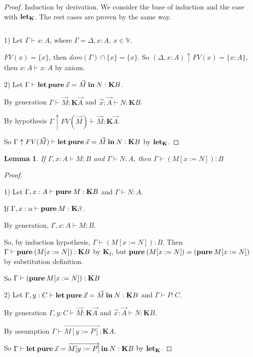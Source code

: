 \documentclass[a4paper]{article}
\newtheorem{lemma}{Lemma}
\begin{document}
  \begin{proof}

  Induction by derivation. We consider the base of induction and the case with  ${\bf let}_{\textbf{K}}$. The rest
  cases are
  proven by the same way.

  $ $

  1) Let $\Gamma \vdash x : A$, where $\Gamma = \Delta, x : A$, $x \in \mathbb{V}$.

  $FV(x) = \{ x\}$, then $dom(\Gamma) \cap \{ x\} = \{ x\}. $ So $(\Delta, x : A) \uparrow FV(x) = \{ x
  : A\}$, then $x : A \vdash x : A$ by axiom.

  2) Let $\Gamma \vdash {\bf let \: pure \:} \vec{x} = \vec{M} {\bf \: in \:} N : \textbf{K}B$.

  By generation $\Gamma \vdash \vec{M} : \textbf{K}\vec{A}$ and $\vec{x} : \vec{A} \vdash N : \textbf{K}B$.

  By hypothesis $\Gamma \uparrow FV(\vec{M}) \vdash \vec{M} : \textbf{K}\vec{A}$.

  So $\Gamma \uparrow FV(\vec{M}) \vdash {\bf let \: pure \:} \vec{x} = \vec{M} {\bf \: in \:} N : \textbf{K}B$ by ${\bf let}_{\textbf{K}}$.

  \end{proof}

  \vspace{\baselineskip}

  \begin{lemma}

  If $\Gamma, x : A \vdash M : B$  and $\Gamma \vdash N : A$, then $\Gamma \vdash (M [x := N]) :
  B $

  \end{lemma}

  \begin{proof}

  $ $

  1) Let $\Gamma, x : A \vdash {\bf pure \: } M : \textbf{K}B$ and $\Gamma \vdash N : A$.

  If $\Gamma, x : \alpha \vdash {\bf pure \: } M : \textbf{K}\beta$.

  By generation, $\Gamma, x : A \vdash M : B$.

  So, by induction hypothesis, $\Gamma \vdash (M [x := N]) : B $.
  Then $\Gamma \vdash {\bf pure \: } (M [x := N]) : \textbf{K}B$ by $\textbf{K}_I$, but ${\bf pure \: } (M [x := N]) =
  ({\bf pure \: } M [x := N])$ by substitution definition.

  So $\Gamma \vdash ({\bf pure \: } M [x := N]) : \textbf{K}B$

  2) Let $\Gamma, y : C \vdash {\bf let \: pure \:} \vec{x} = \vec{M} {\bf \: in \:} N : \textbf{K}B$ and $\Gamma \vdash P : C$.

  By generation $\Gamma, y : C \vdash \vec{M} : \textbf{K}\vec{A}$ and $\vec{x} : \vec{A} \vdash N : \textbf{K}B$.

  By assumption $\Gamma \vdash \overrightarrow{M [y := P]} : \textbf{K}A$.

  So $\Gamma \vdash {\bf let \: pure \:} \vec{x} = \overrightarrow{M [y := P]} {\bf \: in \:} N : \textbf{K}B$ by ${\bf let}_{\textbf{K}}$.

  \end{proof}
\end{document}
